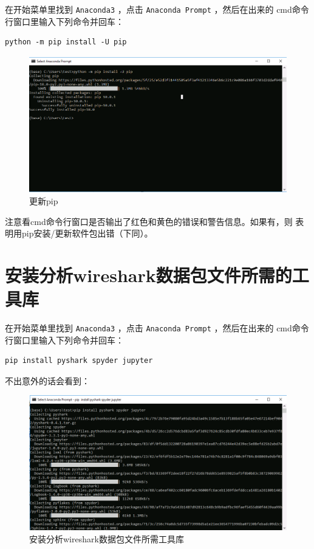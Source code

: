\documentclass[12pt,a4paper]{article}
\begin{document}
在开始菜单里找到 \texttt{Anaconda3} ，点击 \texttt{Anaconda Prompt} ，然后在出来的
cmd命令行窗口里输入下列命令并回车：

\begin{verbatim}
python -m pip install -U pip
\end{verbatim}

\begin{figure}[htbp]
\centering
\includegraphics[width=.9\linewidth]{./images/chap0/update_pip.png}
\caption{\label{fig:org5de5729}
更新pip}
\end{figure}

注意看cmd命令行窗口是否输出了红色和黄色的错误和警告信息。如果有，则
表明用pip安装/更新软件包出错（下同）。

\section{安装分析wireshark数据包文件所需的工具库}
\label{sec:org92e9036}

在开始菜单里找到 \texttt{Anaconda3} ，点击 \texttt{Anaconda Prompt} ，然后在出来的
cmd命令行窗口里输入下列命令并回车：

\begin{verbatim}
pip install pyshark spyder jupyter
\end{verbatim}

不出意外的话会看到：

\begin{figure}[htbp]
\centering
\includegraphics[width=.9\linewidth]{./images/chap0/install_pyshark_spyder_jupyter.png}
\caption{\label{fig:orgc1166ac}
安装分析wireshark数据包文件所需工具库}
\end{figure}
\end{document}
